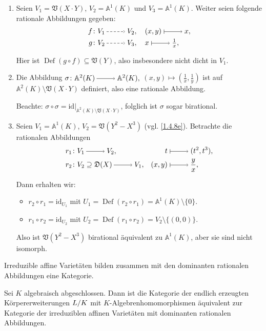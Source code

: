 \documentclass[a4paper,12pt,index=toc]{scrbook}
\theoremstyle{keinenummern} %
\def\A{\mathbb{A}}
\def\V{\mathfrak{V}}
\newcommand{\D}{\mathfrak{D}}
\newcommand{\id}{\mathrm{id}}
\newcommand{\Def}{\operatorname{Def}}
\newcommand{\restrict}[1]{|_{#1}}
\begin{document}
\begin{bsp}\label{1.6.6}
  \begin{enumerate}
  \item{} Seien $V_1=\V(X\cdot Y)$, $V_2=\A^1(K)$ und $V_3=\A^1(K)$. Weiter seien folgende rationale Abbildungen gegeben:
  \begin{align*}f\colon&V_1\ppf V_2, \quad (x,y)\mapsto x,\\
  g\colon&V_2\ppf V_3, \quad x\mapsto \tfrac{1}{x},\end{align*}

  Hier ist $\Def(g\circ f)\subseteq \V(Y)$, also insbesondere nicht dicht in $V_1$.
  \item{} Die Abbildung $\sigma \colon \A^2(K)\ra \A^2(K),$  $(x,y)\mapsto (\frac{1}{x},\frac{1}{y})$ ist auf $\A^2(K)\setminus \V(X\cdot Y)$ definiert, also eine rationale Abbildung.

  Beachte: $\sigma\circ \sigma=\id{\restrict{\A^2(K)\setminus\V(X\cdot Y)}}$, folglich ist $\sigma$ sogar birational.

  \item\label{1.6.6c} Seien $V_1=\A^1(K)$, $V_2=\V(Y^2-X^3)$ (vgl. \cref{1.4.8e}). Betrachte die rationalen Abbildungen 
  \begin{align*}r_1 &\colon V_1\ra V_2,& t&\mapsto (t^2,t^3),\\  
  r_2 &\colon V_2\supseteq \D(X)\ra V_1,& (x,y)&\mapsto \frac{y}{x},\end{align*}

  Dann erhalten wir:\begin{itemize}
     \item $r_2\circ r_1=\id_{U_1}$ mit $U_1=\Def(r_2\circ r_1)=\A^1(K)\setminus \{0\}$.
     \item $r_1\circ r_2=\id_{U_2}$ mit $U_2=\Def(r_1\circ r_2)=V_2\setminus \{(0,0)\}$.
     \end{itemize}
  Also ist $\V(Y^2-X^3)$ birational äquivalent zu $\A^1(K)$, aber sie sind nicht isomorph.
  \end{enumerate}
\end{bsp}  

\begin{nbem}
Irreduzible affine Varietäten bilden zusammen mit den dominanten rationalen Abbildungen  eine Kategorie.
\end{nbem}
 
\begin{satz}\label{satz4} Sei $K$ algebraisch abgeschlossen. Dann ist die Kategorie der endlich erzeugten Körper\-erweiterungen $\Quotient{L}{K}$ mit $K$-Algebrenhomomorphismen äquivalent zur Kategorie der irreduziblen affinen Varietäten mit dominanten rationalen Abbildungen.
\end{satz}
\end{document}
